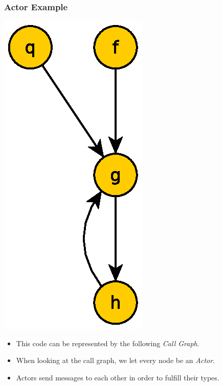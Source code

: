 \documentclass{beamer}
\begin{document}
\begin{frame}[fragile]
  \frametitle{Actor Example}

  \begin{multicols}{2}
    \begin{center}
      \includegraphics[width=0.7\linewidth]{media/theexamp.eps}
    \end{center}

    \begin{itemize}
      \item This code can be represented by the following \emph{Call
          Graph}.
      \item  When looking at the call graph, we let every node be an 
        \emph{Actor}.
      \item Actors send messages to each other in order to fulfill
        their types. 
    \end{itemize}
  \end{multicols}
\end{frame}
\end{document}
